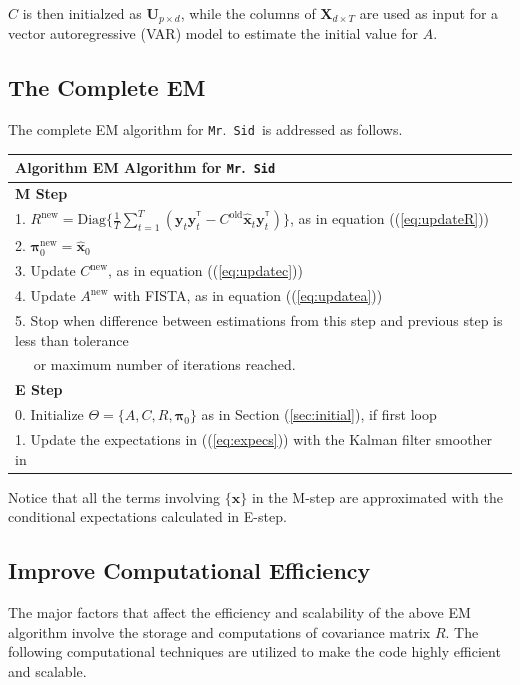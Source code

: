 \documentclass[fleqn]{article}
\let\oldref\ref
\renewcommand{\ref}[1]{(\oldref{#1})}
\newcommand{\T}{^{\ensuremath{\mathsf{T}}}}           %
\newcommand{\mrsid}{{\sc \texttt{Mr}.~\texttt{Sid}}}
\begin{document}
$C$ is then initialzed as $\mathbf{U}_{p\times d}$, while the columns of $\mathbf{X}_{d \times T}$ are used as input for a vector autoregressive (VAR) model to estimate the initial value for $A$.

\subsection{The Complete EM}\label{sec:em}
The complete EM algorithm for \mrsid~is addressed as follows.\\

\begin{tabular}{l}
\hline
\textbf{Algorithm } EM Algorithm for \mrsid\\
\hline
\textbf{M Step}\\
1. $R^{\text{new}}=\text{Diag}\biggl\{\frac{1}{T}\sum\limits_{t=1}^{T}(\mathbf{y}_t\mathbf{y}_t^{\T}-C^{\text{old}} \hat{\mathbf{x}}_t\mathbf{y}_t^{\T})\biggr\}$, as in equation \ref{eq:updateR}\\
2. $\mathbf{\pi}_0^{\text{new}}=\hat{\mathbf{x}}_0$\\
3. Update $C^{\text{new}}$, as in equation \ref{eq:updatec}\\
4. Update $A^{\text{new}}$ with FISTA, as in equation \ref{eq:updatea}\\
5. Stop when difference between estimations from this step and previous step is less than tolerance\\
  $\quad$ or maximum number of iterations reached.\\
\hline
\textbf{E Step}\\
0. Initialize $\Theta =\{A,C,R,\mathbf{\pi}_0\}$ as in Section \oldref{sec:initial}, if first loop\\
1. Update the expectations in \ref{eq:expecs} with the Kalman filter smoother in \nameref{sec:appendix1}\\
\hline
\end{tabular}

Notice that all the terms involving $\{\mathbf{x}\}$ in the M-step are approximated with the conditional expectations calculated in E-step.

\subsection{Improve Computational Efficiency}
The major factors that affect the efficiency and scalability of the above EM algorithm involve the storage and computations of covariance matrix $R$. The following computational techniques are utilized to make the code highly efficient and scalable.
\end{document}

